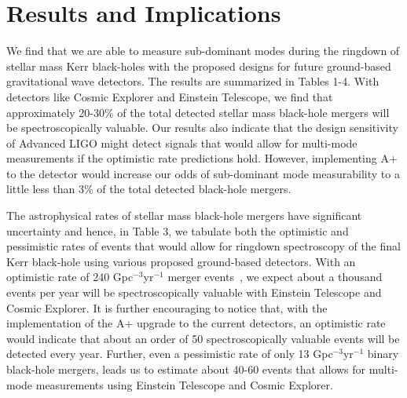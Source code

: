 \section{Results and Implications}
\label{sec:results}

We find that we are able to measure sub-dominant modes during the ringdown of stellar mass Kerr black-holes with the proposed designs for future ground-based gravitational wave detectors. The results are summarized in Tables 1-4. With detectors like Cosmic Explorer and Einstein Telescope, we find that approximately 20-30\% of the total detected stellar mass black-hole mergers will be spectroscopically valuable. Our results also indicate that the design sensitivity of Advanced LIGO might detect signals that would allow for multi-mode measurements if the optimistic rate predictions hold. However, implementing A+ to the detector would increase our odds of sub-dominant mode measurability to a little less than 3\% of the total detected black-hole mergers.

The astrophysical rates of stellar mass black-hole mergers have significant uncertainty and hence, in Table 3, we tabulate both the optimistic and pessimistic rates of events that would allow for ringdown spectroscopy of the final Kerr black-hole using various proposed ground-based detectors. With an optimistic rate of 240 Gpc$^{-3}$yr$^{-1}$ merger events~\cite{LIGO:2016Rates}, we expect about a thousand events per year will be spectroscopically valuable with Einstein Telescope and Cosmic Explorer. It is further encouraging to notice that, with the implementation of the A+ upgrade to the current detectors, an optimistic rate would indicate that about an order of 50 spectroscopically valuable events will be detected every year. Further, even a pessimistic rate of only 13 Gpc$^{-3}$yr$^{-1}$ binary black-hole mergers, leads us to estimate about 40-60 events that allows for multi-mode measurements using Einstein Telescope and Cosmic Explorer.


